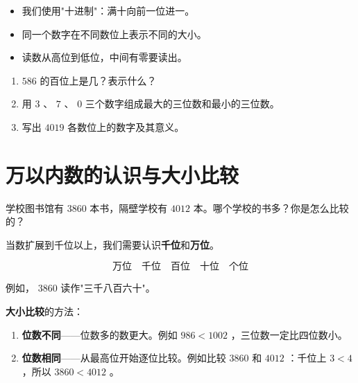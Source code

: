 \begin{keytakeaway}


\begin{itemize}
  \item 我们使用"十进制"：满十向前一位进一。
  \item 同一个数字在不同数位上表示不同的大小。
  \item 读数从高位到低位，中间有零要读出。
\end{itemize}


\end{keytakeaway}

\begin{practice}


\begin{enumerate}
  \item $586$ 的百位上是几？表示什么？
  \item 用 $3$ 、 $7$ 、 $0$ 三个数字组成最大的三位数和最小的三位数。
  \item 写出 $4019$ 各数位上的数字及其意义。
\end{enumerate}


\end{practice}

\section*{万以内数的认识与大小比较}


\begin{explore}


学校图书馆有 $3860$ 本书，隔壁学校有 $4012$ 本。哪个学校的书多？你是怎么比较的？

\end{explore}

\begin{understand}


当数扩展到千位以上，我们需要认识\textbf{千位}和\textbf{万位}。

\[
\text{万位} \quad \text{千位} \quad \text{百位} \quad \text{十位} \quad \text{个位}
\]


例如， $3860$ 读作"三千八百六十"。

\textbf{大小比较}的方法：
\begin{enumerate}
  \item \textbf{位数不同}——位数多的数更大。例如 $986 < 1002$ ，三位数一定比四位数小。
  \item \textbf{位数相同}——从最高位开始逐位比较。例如比较 $3860$ 和 $4012$ ：千位上 $3 < 4$ ，所以 $3860 < 4012$ 。
\end{enumerate}


\end{understand}

